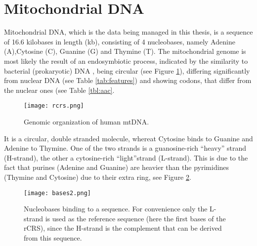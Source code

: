 \section{Mitochondrial DNA}
Mitochondrial DNA, which is the data being managed in this thesis, is a sequence of 16.6 kilobases in length (kb), consisting of 4 nucleobases, namely Adenine (A),Cytosine (C), Guanine (G) and Thymine (T). The mitochondrial genome is most likely the result of an endosymbiotic process, indicated by the similarity to bacterial (prokaryotic) DNA \cite{Pittis2016}, being circular (see Figure \ref{fig:rcrs}), differing significantly from nuclear DNA (see Table \ref{tab:features}) and showing codons, that differ from the nuclear ones (see Table \ref{tbl:aac}. 
\begin{figure}[ht]
\begin{center}
\texttt{[image: rcrs.png]}
\caption[Genomic organization of human mtDNA]{Genomic organization of human mtDNA. }
\label{fig:rcrs}
\end{center}
\end{figure}
It is a circular, double stranded molecule, whereat Cytosine binds to Guanine and Adenine to Thymine. One of the two strands is a guanosine-rich "`heavy"' strand (H-strand), the other a cytosine-rich "`light"'strand (L-strand). This is due to the fact that purines (Adenine and Guanine) are heavier than the pyrimidines (Thymine and Cytosine) due to their extra ring, see Figure \ref{fig:figureBases}.
\begin{figure}[ht]
\begin{center}
\texttt{[image: bases2.png]}
\caption[Nucleobases binding to a sequence]{Nucleobases binding to a sequence. For convenience only the L-strand is used as the reference sequence (here the first bases of the rCRS), since the H-strand is the complement that can be derived from this sequence.}
\label{fig:figureBases}
\end{center}
\end{figure}

